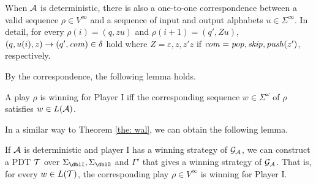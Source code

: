When ${\cal A}$ is deterministic,
there is also a one-to-one correspondence between
a valid sequence $\rho\in V^\infty$ and a sequence of input and output alphabets $u\in\Sigma^\infty$.
In detail, for every $\rho(i) = (q, zu)$ and $\rho(i+1) = (q', Zu)$,
$(q, u(i), z) \to (q', \mathit{com})\in\delta$ hold
where $Z=\varepsilon, z, z'z$ if $\mathit{com}=\mathit{pop},\mathit{skip},\mathit{push}(z')$, respectively.


By the correspondence, the following lemma holds.
\begin{lemma}
\label{lem: 1}
A play $\rho$ is winning for Player I iff
the corresponding sequence $w\in \Sigma^\omega$ of $\rho$
satisfies $w\in L({\cal A})$.
\end{lemma}

In a similar way to Theorem \ref{the: wal},
we can obtain the following lemma.
\begin{lemma}
\label{lem: 2}
If ${\cal A}$ is deterministic and player I has a winning strategy of ${\cal G}_{\cal A}$,
we can construct a PDT ${\cal T}$ over $\Sigma_\dblI, \Sigma_\dblO$ and $\Gamma'$ that gives a winning strategy of ${\cal G}_{\cal A}$.
That is, for every $w\in L({\cal T})$, the corresponding play $\rho\in V^\infty$ is winning for Player I.
\end{lemma}
